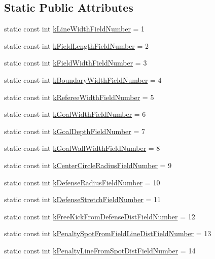 \subsection*{Static Public Attributes}
\begin{DoxyCompactItemize}
\item 
static const int \hyperlink{class_s_s_l___geometry_field_size_a03093d89aee5350979ba0574db250812}{k\-Line\-Width\-Field\-Number} = 1
\item 
static const int \hyperlink{class_s_s_l___geometry_field_size_ad2e5895326ca24d484b42775c5f4fd80}{k\-Field\-Length\-Field\-Number} = 2
\item 
static const int \hyperlink{class_s_s_l___geometry_field_size_a7ee6c3c2c7f9309f25ff5a9b7572f72e}{k\-Field\-Width\-Field\-Number} = 3
\item 
static const int \hyperlink{class_s_s_l___geometry_field_size_ab325e3526ce9bda9710d5c8cd1fb101d}{k\-Boundary\-Width\-Field\-Number} = 4
\item 
static const int \hyperlink{class_s_s_l___geometry_field_size_acdeb5d084b614878d1fbbea839c64e32}{k\-Referee\-Width\-Field\-Number} = 5
\item 
static const int \hyperlink{class_s_s_l___geometry_field_size_a7621fbcaa174a81e002c06cdc425ff8d}{k\-Goal\-Width\-Field\-Number} = 6
\item 
static const int \hyperlink{class_s_s_l___geometry_field_size_a7ebc96978b6c0c5c669346ca08e0800a}{k\-Goal\-Depth\-Field\-Number} = 7
\item 
static const int \hyperlink{class_s_s_l___geometry_field_size_aab5fc5aa9283ad12b87375be61a65f48}{k\-Goal\-Wall\-Width\-Field\-Number} = 8
\item 
static const int \hyperlink{class_s_s_l___geometry_field_size_a96a136f3eca9f691f5c14bdceb6ca315}{k\-Center\-Circle\-Radius\-Field\-Number} = 9
\item 
static const int \hyperlink{class_s_s_l___geometry_field_size_a3338fa113068fb99e6282e5f51b54eec}{k\-Defense\-Radius\-Field\-Number} = 10
\item 
static const int \hyperlink{class_s_s_l___geometry_field_size_aa1e35c4c627399f6dcc1080908a10d2e}{k\-Defense\-Stretch\-Field\-Number} = 11
\item 
static const int \hyperlink{class_s_s_l___geometry_field_size_aa356a9133afc48bb2e403eef8b184285}{k\-Free\-Kick\-From\-Defense\-Dist\-Field\-Number} = 12
\item 
static const int \hyperlink{class_s_s_l___geometry_field_size_ad271545218157092602fcaf767cc64a6}{k\-Penalty\-Spot\-From\-Field\-Line\-Dist\-Field\-Number} = 13
\item 
static const int \hyperlink{class_s_s_l___geometry_field_size_ad2cf4e81311c1f72ee4521525929cecf}{k\-Penalty\-Line\-From\-Spot\-Dist\-Field\-Number} = 14
\end{DoxyCompactItemize}
